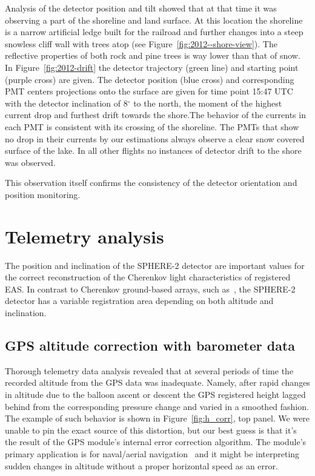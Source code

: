 \documentclass[universe,article,submit,moreauthors,pdftex]{Definitions/mdpi}
\begin{document}
Analysis of the detector position and tilt showed that at that time it was observing a part of the shoreline and land surface. At this location the shoreline is a narrow artificial ledge built for the railroad and further changes into a steep snowless cliff wall with trees atop (see Figure~\ref{fig:2012--shore-view}). The reflective properties of both rock and pine trees is way lower than that of snow. In Figure~\ref{fig:2012-drift} the detector trajectory (green line) and starting point (purple cross) are given. The detector position (blue cross) and corresponding PMT centers projections onto the surface are given for time point 15:47 UTC with the detector inclination of 8$^\circ$ to the north, the moment of the highest current drop and furthest drift towards the shore.The behavior of the currents in each PMT is consistent with its crossing of the shoreline. The PMTs that show no drop in their currents by our estimations always observe a clear snow covered surface of the lake. In all other flights no instances of detector drift to the shore was observed. 

This observation itself confirms the consistency of the detector orientation and position monitoring.

\section{Telemetry analysis}

The position and inclination of the SPHERE-2 detector are important values for the correct reconstruction of the Cherenkov light characteristics of registered EAS. In contrast to Cherenkov ground-based arrays, such as~\cite{Yakutsk19,TUNKA133}, the SPHERE-2 detector has a variable registration area depending on both altitude and inclination.

\subsection{GPS altitude correction with barometer data}
\label{sect:gps_correction}

Thorough telemetry data analysis revealed that at several periods of time the recorded altitude from the GPS data was inadequate. Namely, after rapid changes in altitude due to the balloon ascent or descent the GPS registered height lagged behind from the corresponding pressure change and varied in a smoothed fashion. The example of such behavior is shown in Figure~\ref{fig:h_corr}, top panel. We were unable to pin the exact source of this distortion, but our best guess is that it's the result of the GPS module's internal error correction algorithm. The module's primary application is for naval/aerial navigation~\cite{GPS-module-specs} and it might be interpreting sudden changes in altitude without a proper horizontal speed as an error.
\end{document}
